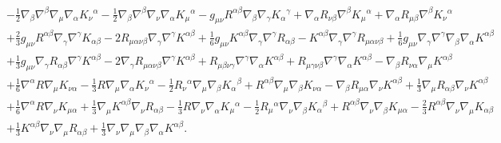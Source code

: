 \documentclass[aps]{revtex4}
\begin{document}
\begin{eqnarray}
\nonumber\\
&&-  \tfrac{1}{2} \nabla_{\beta}\nabla^{\beta}\nabla_{\mu}\nabla_{\alpha}K_{\nu}{}^{\alpha} -  \tfrac{1}{2} \nabla_{\beta}\nabla^{\beta}\nabla_{\nu}\nabla_{\alpha}K_{\mu}{}^{\alpha} -  g_{\mu \nu} R^{\alpha \beta} \nabla_{\beta}\nabla_{\gamma}K_{\alpha}{}^{\gamma} + \nabla_{\alpha}R_{\nu \beta} \nabla^{\beta}K_{\mu}{}^{\alpha} + \nabla_{\alpha}R_{\mu \beta} \nabla^{\beta}K_{\nu}{}^{\alpha} 
\nonumber\\
&&+ \tfrac{2}{3} g_{\mu \nu} R^{\alpha \beta} \nabla_{\gamma}\nabla^{\gamma}K_{\alpha \beta} - 2 R_{\mu \alpha \nu \beta} \nabla_{\gamma}\nabla^{\gamma}K^{\alpha \beta} + \tfrac{1}{6} g_{\mu \nu} K^{\alpha \beta} \nabla_{\gamma}\nabla^{\gamma}R_{\alpha \beta} -  K^{\alpha \beta} \nabla_{\gamma}\nabla^{\gamma}R_{\mu \alpha \nu \beta} + \tfrac{1}{6} g_{\mu \nu} \nabla_{\gamma}\nabla^{\gamma}\nabla_{\beta}\nabla_{\alpha}K^{\alpha \beta} 
\nonumber\\
&&+ \tfrac{1}{3} g_{\mu \nu} \nabla_{\gamma}R_{\alpha \beta} \nabla^{\gamma}K^{\alpha \beta} - 2 \nabla_{\gamma}R_{\mu \alpha \nu \beta} \nabla^{\gamma}K^{\alpha \beta} + R_{\mu \beta \nu \gamma} \nabla^{\gamma}\nabla_{\alpha}K^{\alpha \beta} + R_{\mu \gamma \nu \beta} \nabla^{\gamma}\nabla_{\alpha}K^{\alpha \beta} -  \nabla_{\beta}R_{\nu \alpha} \nabla_{\mu}K^{\alpha \beta} 
\nonumber\\
&&+ \tfrac{1}{6} \nabla^{\alpha}R \nabla_{\mu}K_{\nu \alpha} -  \tfrac{1}{3} R \nabla_{\mu}\nabla_{\alpha}K_{\nu}{}^{\alpha} -  \tfrac{1}{2} R_{\nu}{}^{\alpha} \nabla_{\mu}\nabla_{\beta}K_{\alpha}{}^{\beta} + R^{\alpha \beta} \nabla_{\mu}\nabla_{\beta}K_{\nu \alpha} -  \nabla_{\beta}R_{\mu \alpha} \nabla_{\nu}K^{\alpha \beta} + \tfrac{1}{3} \nabla_{\mu}R_{\alpha \beta} \nabla_{\nu}K^{\alpha \beta} 
\nonumber\\
&&+ \tfrac{1}{6} \nabla^{\alpha}R \nabla_{\nu}K_{\mu \alpha} + \tfrac{1}{3} \nabla_{\mu}K^{\alpha \beta} \nabla_{\nu}R_{\alpha \beta} -  \tfrac{1}{3} R \nabla_{\nu}\nabla_{\alpha}K_{\mu}{}^{\alpha} -  \tfrac{1}{2} R_{\mu}{}^{\alpha} \nabla_{\nu}\nabla_{\beta}K_{\alpha}{}^{\beta} + R^{\alpha \beta} \nabla_{\nu}\nabla_{\beta}K_{\mu \alpha} -  \tfrac{2}{3} R^{\alpha \beta} \nabla_{\nu}\nabla_{\mu}K_{\alpha \beta} 
\nonumber\\
&&+ \tfrac{1}{3} K^{\alpha \beta} \nabla_{\nu}\nabla_{\mu}R_{\alpha \beta} + \tfrac{1}{3} \nabla_{\nu}\nabla_{\mu}\nabla_{\beta}\nabla_{\alpha}K^{\alpha \beta}.
\label{AP54}
\end{eqnarray}
%
\end{document}
